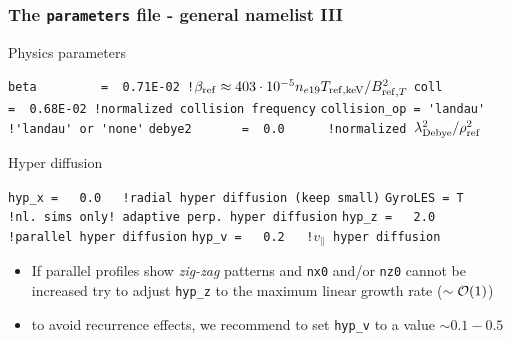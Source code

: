 \documentclass[9pt]{beamer}
\begin{document}
\begin{frame}[fragile]
  \frametitle{The {\tt parameters} file - general namelist III}

\begin{block}{Physics parameters}

\verb|beta         =  0.71E-02 !|$\beta_{\rm ref}\approx 403\cdot 10^{-5} n_{e19} T_{{\rm ref} ,\mathrm{keV}}/B_{{\rm ref} ,T}^2$
\verb|coll         =  0.68E-02 !normalized collision frequency|
\verb|collision_op = 'landau'  !'landau' or 'none'|
\verb|debye2       =  0.0      !normalized |$\lambda^2_{\rm Debye}/\rho_{\rm ref}^2$
\end{block}

\begin{block}{Hyper diffusion}

\begin{block}

\verb|hyp_x =   0.0   !radial hyper diffusion (keep small)|
\verb|GyroLES = T     !nl. sims only! adaptive perp. hyper diffusion|
\verb|hyp_z =   2.0   !parallel hyper diffusion|
\verb|hyp_v =   0.2   !|$v_\parallel$\verb| hyper diffusion|
\end{block}
\begin{itemize}
\item If parallel profiles %
show {\em zig-zag} patterns and {\tt nx0} and/or {\tt nz0} cannot be increased try to adjust {\tt hyp\_z} to the maximum linear growth rate ($\sim {\cal O}(1)$)
\item to avoid recurrence effects, we recommend to set {\tt hyp\_v} to a value $\sim 0.1-0.5$
\end{itemize}
\end{block}

\end{frame}

\end{document}

